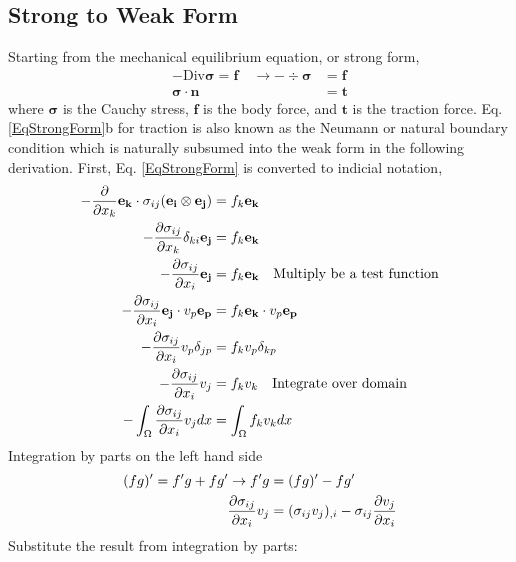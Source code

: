 \documentclass[12pt,3p]{article}
\begin{document}
\subsection{Strong to Weak Form}
Starting from the mechanical equilibrium equation, or strong form,
\begin{subequations}\label{EqStrongForm}
\begin{align}
- \text{Div} \bm{\sigma} = \mathbf{f} \quad \rightarrow - \div \bm{\sigma} &= \mathbf{f} \\
	\bm{\sigma} \cdot \textbf{n} &= \mathbf{t} 
\end{align}
\end{subequations}
where $\bm{\sigma}$ is the Cauchy stress, $\mathbf{f}$ is the body force, and $\mathbf{t}$ is the traction force. Eq. \ref{EqStrongForm}b for traction is also known as the Neumann or natural boundary condition which is naturally subsumed into the weak form in the following derivation. First, Eq. \ref{EqStrongForm} is converted to indicial notation,
\begin{align*}
\begin{split}
- \pdv{}{x_k} \mathbf{e_k} \cdot \sigma_{ij} (\mathbf{e_i} \otimes \mathbf{e_j}) &= f_k \mathbf{e_k} \\
- \pdv{\sigma_{ij}}{x_k} \delta_{ki} \mathbf{e_j} &= f_k \mathbf{e_k} \\
- \pdv{\sigma_{ij}}{x_i} \mathbf{e_j} &= f_k \mathbf{e_k} \quad \text{Multiply be a test function} \\
- \pdv{\sigma_{ij}}{x_i} \mathbf{e_j} \cdot v_p \mathbf{e_p} &= f_k \mathbf{e_k} \cdot v_p \mathbf{e_p} \\
- \pdv{\sigma_{ij}}{x_i} v_p \delta_{jp} &= f_k v_p \delta_{kp} \\
		 - \pdv{\sigma_{ij}}{x_i} v_j &= f_k v_k \quad \text{Integrate over domain} \\
 - \int_{\Omega} \pdv{\sigma_{ij}}{x_i} v_j dx &= \int_{\Omega} f_k v_k dx \\
\end{split}
\end{align*}
Integration by parts on the left hand side
\begin{align*}
(fg)' = f'g + fg' \rightarrow f'g &= (fg)' - fg' \\
\pdv{\sigma_{ij}}{x_i} v_j &= (\sigma_{ij} v_j)_{,i} - \sigma_{ij} \pdv{v_j}{x_i} 
\end{align*}
Substitute the result from integration by parts: 
\end{document}
